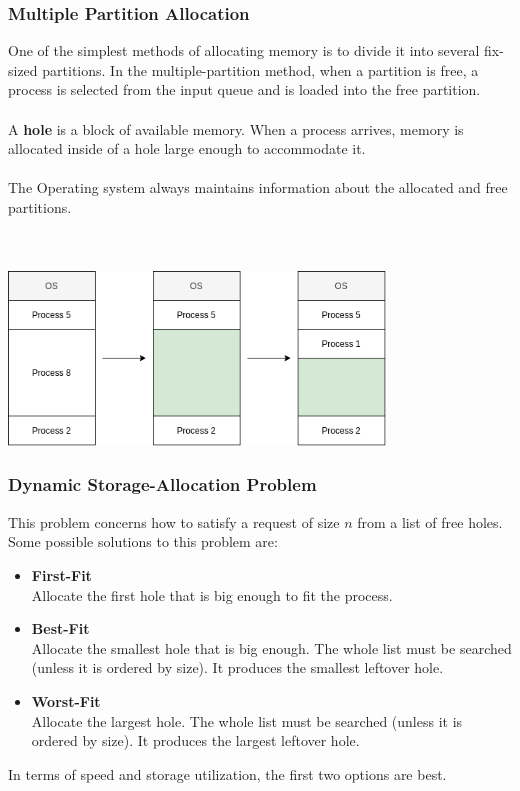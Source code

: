 \documentclass{article}
\begin{document}
\subsubsection{Multiple Partition Allocation}
One of the simplest methods of allocating memory is to divide it into several fix-sized partitions. In the multiple-partition method, when a partition is free, a process is selected from the input queue and is loaded into the free partition. \\ \\
A \textbf{hole} is a block of available memory. When a process arrives, memory is allocated inside of a hole large enough to accommodate it. \\ \\
The Operating system always maintains information about the allocated and free partitions. \\ \\ \\

\centerline{\includegraphics[width=10cm]{./assets/mult-partition.png}}
\vspace{.4cm}

\subsubsection{Dynamic Storage-Allocation Problem}
This problem concerns how to satisfy a request of size $n$ from a list of free holes. Some possible solutions to this problem are:

\begin{itemize}
	\item \textbf{First-Fit}
	\vspace{.2cm} \\
	Allocate the first hole that is big enough to fit the process.
	
	\item \textbf{Best-Fit}
	\vspace{.2cm} \\
	Allocate the smallest hole that is big enough. The whole list must be searched (unless it is ordered by size). It produces the smallest leftover hole.
	
	\item \textbf{Worst-Fit}
	\vspace{.2cm} \\
	Allocate the largest hole. The whole list must be searched (unless it is ordered by size). It produces the largest leftover hole.
\end{itemize}
In terms of speed and storage utilization, the first two options are best.
\end{document}
